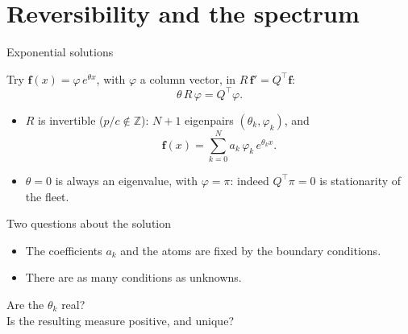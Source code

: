 \documentclass[aspectratio=169]{beamer}
\renewcommand{\phi}{\varphi}
\newenvironment*{myitem}[1][1.5em]{\begin{itemize}\setlength{\itemsep}{#1}}{\end{itemize}}
\begin{document}
\section{Reversibility and the spectrum}

\begin{frame}{Exponential solutions}

	Try $\mathbf{f}(x)=\phi\,e^{\theta x}$, with $\phi$ a column vector, in $R\,\mathbf f'=Q^\top\mathbf f$:
	\begin{equation*}
		\theta\,R\,\phi = Q^\top\phi .
	\end{equation*}

	\medskip

	\begin{myitem}
		\item $R$ is invertible ($p/c\notin\mathbb Z$): $N+1$ eigenpairs $(\theta_k,\phi_k)$, and
		\begin{equation*}
			\mathbf{f}(x) = \sum_{k=0}^{N} a_k\,\phi_k\,e^{\theta_k x}.
		\end{equation*}
		\item $\theta=0$ is always an eigenvalue, with $\phi=\pi$: indeed $Q^\top\pi=0$ is stationarity of the fleet.
	\end{myitem}
\end{frame}

\begin{frame}{Two questions about the solution}

	\begin{myitem}
		\item The coefficients $a_k$ and the atoms are fixed by the \alert{boundary conditions}.
		\item There are as many conditions as unknowns.
	\end{myitem}

	\medskip
	\pause

	\begin{block}{}
		\begin{center}
		Are the $\theta_k$ \alert{real}?\\[0.5em]
		Is the resulting measure \alert{positive}, and \alert{unique}?
		\end{center}
	\end{block}
\end{frame}
\end{document}
